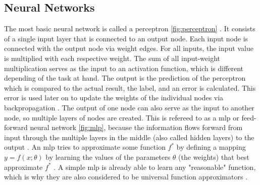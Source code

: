 \subsection{Neural Networks}
\label{ch:preliminaries-deepLearningArchitectures-neuralNetworks}

The most basic neural network is called a perceptron \autoref{fig:perceptron} \cite{rosenblatt1958PerceptronProbabilisticModel}.
It consists of a single input layer that is connected to an output node.
Each input node is connected with the output node via weight edges.
For all inputs, the input value is multiplied with each respective weight.
The sum of all input-weight multiplication serves as the input to an activation function, which is different depending of the task at hand.
The output is the prediction of the perceptron which is compared to the actual result, the label, and an error is calculated.
This error is used later on to update the weights of the individual nodes via backpropagation \cite{aggarwal2018NeuralNetworksDeep}.
The output of one node can also serve as the input to another node, so multiple layers of nodes are created.
This is refereed to as a \gls{mlp} or feed-forward neural network \autoref{fig:mlp}, 
because the information flows forward from input through the multiple layers in the middle (also called hidden layers) to the output \cite{aggarwal2018NeuralNetworksDeep, Goodfellow-et-al-2016}.
An \gls{mlp} tries to approximate some function $f^*$ by defining a mapping $y=f(x;\theta)$ by learning the values of the parameters $\theta$ (\ie the weights) that best approximate $f^*$ \cite{Goodfellow-et-al-2016}.
A simple \gls{mlp} is already able to learn any "reasonable" function, which is why they are also considered to be universal function approximators \cite{aggarwal2018NeuralNetworksDeep, hornik1989MultilayerFeedforwardNetworks}.


